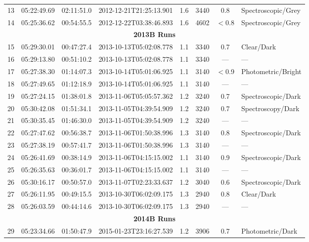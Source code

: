 \documentclass[12pt]{article}
\begin{document}
\begin{table}
\begin{center}
\begin{threeparttable}
\begin{tabular}{lccccccl}
	13 & 05:22:49.69 & 02:11:51.0 & 2012-12-21T21:25:13.901 & 1.6  & 3440 & 0.8      & Spectroscopic/Grey  \\
	14 & 05:25:36.62 & 00:54:55.5 & 2012-12-22T03:38:46.893 & 1.6  & 4602 & $<$0.8   & Spectroscopic/Grey  \\
	\multicolumn{8}{c}{{\bf 2013B Runs}} \\
	15 & 05:29:30.01 & 00:47:27.4 & 2013-10-13T05:02:08.778 & 1.1  & 3340 & 0.7      & Clear/Dark          \\
	16 & 05:29:13.80 & 00:51:10.2 & 2013-10-13T05:02:08.778 & 1.1  & 3340 & ---      & ---                 \\
	17 & 05:27:38.30 & 01:14:07.3 & 2013-10-14T05:01:06.925 & 1.1  & 3140 & $<$0.9   & Photometric/Bright  \\
	18 & 05:27:49.65 & 01:12:18.9 & 2013-10-14T05:01:06.925 & 1.1  & 3140 & ---      & ---                 \\
	19 & 05:27:24.15 & 01:38:01.8 & 2013-11-06T05:05:57.362 & 1.2  & 3240 & 0.7      & Spectroscopic/Dark  \\
	20 & 05:30:42.08 & 01:51:34.1 & 2013-11-05T04:39:54.909 & 1.2  & 3240 & 0.7      & Spectroscopy/Dark   \\
	21 & 05:30:35.45 & 01:46:30.0 & 2013-11-05T04:39:54.909 & 1.2  & 3240 & ---      & ---                 \\
	22 & 05:27:47.62 & 00:56:38.7 & 2013-11-06T01:50:38.996 & 1.3  & 3140 & 0.8      & Spectroscopic/Dark  \\
	23 & 05:27:38.19 & 00:57:41.7 & 2013-11-06T01:50:38.996 & 1.3  & 3140 & ---      & ---                 \\
	24 & 05:26:41.69 & 00:38:14.9 & 2013-11-06T04:15:15.002 & 1.1  & 3140 & 0.9      & Spectroscopic/Dark  \\
	25 & 05:26:35.63 & 00:36:01.7 & 2013-11-06T04:15:15.002 & 1.1  & 3140 & ---      & ---                 \\
	26 & 05:30:16.17 & 00:50:57.0 & 2013-11-07T02:23:33.637 & 1.2  & 3040 & 0.6      & Spectroscopic/Dark  \\
	27 & 05:26:11.95 & 00:49:15.5 & 2013-10-30T06:02:09.175 & 1.3  & 2940 & 0.8      & Clear/Dark          \\
	28 & 05:26:03.59 & 00:44:14.6 & 2013-10-30T06:02:09.175 & 1.3  & 2940 & ---      & ---                 \\
	\multicolumn{8}{c}{{\bf 2014B Runs}} \\
	29 & 05:23:34.66 & 01:50:47.9 & 2015-01-23T23:16:27.539 & 1.2  & 3906 & 0.7      & Photometric/Dark    \\

\end{tabular}
\end{threeparttable}
\end{center}
\end{table}
\end{document}
